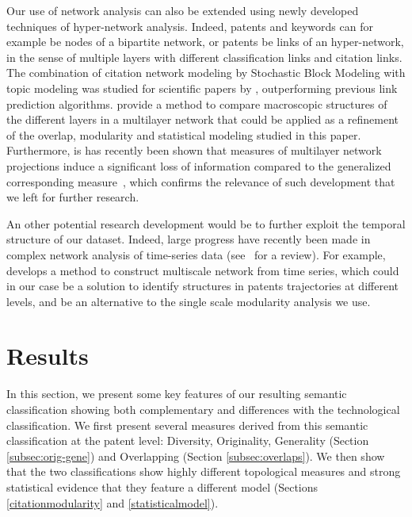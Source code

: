 \documentclass[article]{article}%
\begin{document}
Our use of network analysis can also be extended using newly developed techniques of hyper-network analysis. Indeed, patents and keywords can for example be nodes of a bipartite network, or patents be links of an hyper-network, in the sense of multiple layers with different classification links and citation links. The combination of citation network modeling by Stochastic Block Modeling with topic modeling was studied for scientific papers by \cite{zhu2013scalable}, outperforming previous link prediction algorithms. \citet{iacovacci2015mesoscopic} provide a method to compare macroscopic structures of the different layers in a multilayer network that could be applied as a refinement of the overlap, modularity and statistical modeling studied in this paper. Furthermore, is has recently been shown that measures of multilayer network projections induce a significant loss of information compared to the generalized corresponding measure~\cite{de2015ranking}, which confirms the relevance of such development that we left for further research.

An other potential research development would be to further exploit the temporal structure of our dataset. Indeed, large progress have recently been made in complex network analysis of time-series data (see~\citealt{gao2017complex} for a review). For example, \cite{gao2015multiscale} develops a method to construct multiscale network from time series, which could in our case be a solution to identify structures in patents trajectories at different levels, and be an alternative to the single scale modularity analysis we use.

\section{Results \label{result}}

In this section, we present some key features of our resulting semantic classification showing both complementary and differences with the technological classification. We first present several measures derived from this semantic classification at the patent level: Diversity, Originality, Generality (Section \ref{subsec:orig-gene}) and Overlapping (Section \ref{subsec:overlaps}). We then show that the two classifications show highly
different topological measures and strong statistical evidence that they feature a different model (Sections \ref{citationmodularity} and \ref{statisticalmodel}).

\end{document}
